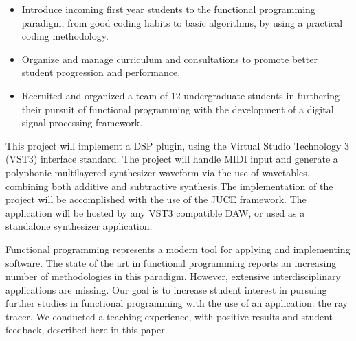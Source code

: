 \documentclass[10pt,a4paper]{altacv}
\begin{document}
\divider

\small{
\begin{itemize}
\item Introduce incoming first year students to the functional programming paradigm, from good coding habits to basic algorithms, by using a practical coding methodology.
\item Organize and manage curriculum and consultations to promote better student progression and performance.
\item Recruited and organized a team of 12 undergraduate students in furthering their pursuit of functional programming with the development of a digital signal processing framework.  
\end{itemize}
}


\small{
	This project will implement a DSP plugin, using the Virtual Studio Technology 3 (VST3) interface standard. The project will handle MIDI input and generate a polyphonic multilayered synthesizer waveform via the use of wavetables, combining both additive and subtractive synthesis.The implementation of the project will be accomplished with the use of the JUCE framework. The application will be hosted by any VST3 compatible DAW, or used as a standalone synthesizer application.
}



\divider

\small{
Functional programming represents a modern tool for applying and implementing software. The state
of the art in functional programming reports an increasing number of methodologies in this paradigm.
However, extensive interdisciplinary applications are missing. Our goal is to increase student interest
in pursuing further studies in functional programming with the use of an application: the ray tracer.
We conducted a teaching experience, with positive results and student feedback, described here in
this paper.
}

\medskip

\clearpage
\end{document}
